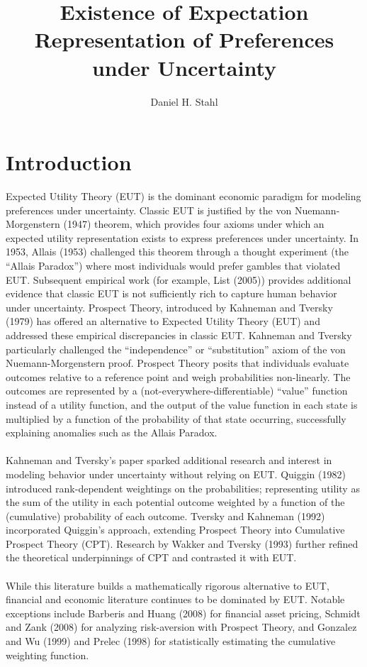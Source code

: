 \documentclass{article}
\begin{document}
	
	
\title{Existence of Expectation Representation of Preferences under Uncertainty}
\date{}
\author{Daniel H. Stahl}

\section{Introduction}

Expected Utility Theory (EUT) is the dominant economic paradigm for modeling preferences under uncertainty. Classic EUT is justified by the von Nuemann-Morgenstern (1947) theorem, which provides four axioms under which an expected utility representation exists to express preferences under uncertainty.  In 1953, Allais (1953) challenged this theorem through a thought experiment (the ``Allais Paradox'') where most individuals would prefer gambles that violated EUT.  Subsequent empirical work (for example, List (2005)) provides additional evidence that classic EUT is not sufficiently rich to capture human behavior under uncertainty. Prospect Theory, introduced by Kahneman and Tversky (1979) has offered an alternative to Expected Utility Theory (EUT) and addressed these empirical discrepancies in classic EUT. Kahneman and Tversky particularly challenged the ``independence'' or ``substitution'' axiom of the von Nuemann-Morgenstern proof.  Prospect Theory posits that individuals evaluate outcomes relative to a reference point and weigh probabilities non-linearly. The outcomes are represented by a (not-everywhere-differentiable) ``value'' function instead of a utility function, and the output of the value function in each state is multiplied by a function of the probability of that state occurring, successfully explaining anomalies such as the Allais Paradox.  
\\
\\
Kahneman and Tversky's paper sparked additional research and interest in modeling behavior under uncertainty without relying on EUT.  Quiggin (1982) introduced rank-dependent weightings on the probabilities; representing utility as the sum of the utility in each potential outcome weighted by a function of the (cumulative) probability of each outcome. Tversky and Kahneman (1992) incorporated Quiggin's approach, extending Prospect Theory into Cumulative Prospect Theory (CPT).  Research by Wakker and Tversky (1993) further refined the theoretical underpinnings of CPT and contrasted it with EUT.
\\
\\
While this literature builds a mathematically rigorous alternative to EUT, financial and economic literature continues to be dominated by EUT.  Notable exceptions include Barberis and Huang (2008) for financial asset pricing, Schmidt and Zank (2008) for analyzing risk-aversion with Prospect Theory, and Gonzalez and Wu (1999) and Prelec (1998) for statistically estimating the cumulative weighting function.  
\end{document}
